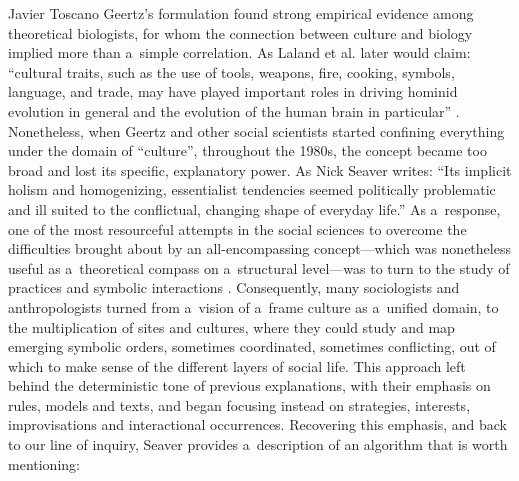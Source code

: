 \begin{artengenv}{Javier Toscano}
Geertz's formulation found strong empirical evidence among theoretical biologists, for whom the connection between culture and biology implied more than a~simple correlation. As Laland et al.
\parencite*[][p.131]{laland_niche_2000} %
 later would claim: ``cultural traits, such as the use of tools, weapons, fire, cooking, symbols, language, and trade, may have played important roles in driving hominid evolution in general and the evolution of the human brain in particular'' 
\parencites[see also][]{dunbar_coevolution_1993}[or][]{aiello_expensive-tissue_1995}. %
 Nonetheless, when Geertz and other social scientists started confining everything under the domain of ``culture'', throughout the 1980s, the concept became too broad and lost its specific, explanatory power. As Nick Seaver 
\parencite*[][p.4]{seaver_algorithms_2017} %
 writes: ``Its implicit holism and homogenizing, essentialist tendencies seemed politically problematic and ill suited to the conflictual, changing shape of everyday life.'' As a~response, one of the most resourceful attempts in the social sciences to overcome the difficulties brought about by an all-encompassing concept---which was nonetheless useful as a~theoretical compass on a~structural level---was to turn to the study of practices and symbolic interactions 
\parencites[][]{bourdieu_outline_1972}[][]{certeau_practice_1984}[][]{blumer_symbolic_1986}. %
 Consequently, many sociologists and anthropologists turned from a~vision of a~frame culture as a~unified domain, to the multiplication of sites and cultures, where they could study and map emerging symbolic orders, sometimes coordinated, sometimes conflicting, out of which to make sense of the different layers of social life. This approach left behind the deterministic tone of previous explanations, with their emphasis on rules, models and texts, and began focusing instead on strategies, interests, improvisations and interactional occurrences. Recovering this emphasis, and back to our line of inquiry, Seaver 
\parencite*[][p.5]{seaver_algorithms_2017} %
 provides a~description of an algorithm that is worth mentioning:
 

\end{artengenv}
